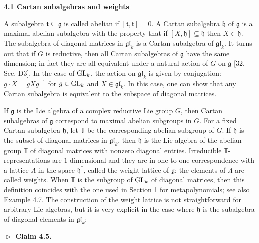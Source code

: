\documentclass[10pt,a4paper]{article}
\begin{document}
\par\medskip\noindent\textbf{4.1 Cartan subalgebras and weights}\par




A subalgebra $\mathfrak{t}\subseteq\mathfrak{g}$ is called abelian if $[\mathfrak{t},\mathfrak{t}]=0$. A Cartan subalgebra $\mathfrak{h}$ of $\mathfrak{g}$ is a maximal abelian subalgebra with the property that if $[X,\mathfrak{h}]\subseteq\mathfrak{h}$ then $X\in\mathfrak{h}$. The subalgebra of diagonal matrices in $\mathfrak{gl}_{k}$ is a Cartan subalgebra of $\mathfrak{gl}_{k}$. It turns out that if $G$ is reductive, then all Cartan subalgebras of $\mathfrak{g}$ have the same dimension; in fact they are all equivalent under a natural action of $G$ on $\mathfrak{g}$ [32, Sec. D3]. In the case of $\textnormal{GL}_{k}$, the action on $\mathfrak{gl}_{k}$ is given by conjugation: $g\cdot X=gXg^{-1}$ for $g\in\textnormal{GL}_{k}$ and $X\in\mathfrak{gl}_{k}$. In this case, one can show that any Cartan subalgebra is equivalent to the subspace of diagonal matrices.





If $\mathfrak{g}$ is the Lie algebra of a complex reductive Lie group $G$, then Cartan subalgebras of $\mathfrak{g}$ correspond to maximal abelian subgroups in $G$. For a fixed Cartan subalgebra $\mathfrak{h}$, let $\mathbb{T}$ be the corresponding abelian subgroup of $G$. If $\mathfrak{h}$ is the subset of diagonal matrices in $\mathfrak{gl}_{k}$, then $\mathfrak{h}$ is the Lie algebra of the abelian group $\mathbb{T}$ of diagonal matrices with nonzero diagonal entries.
Irreducible $\mathbb{T}$-representations are $1$-dimensional and they are in one-to-one correspondence with a lattice $\Lambda$ in the space $\mathfrak{h}^{*}$, called the weight lattice of $\mathfrak{g}$; the elements of $\Lambda$ are called weights. When $\mathbb{T}$ is the subgroup of $\textnormal{GL}_{k}$ of diagonal matrices, then this definition coincides with the one used in Section 1 for metapolynomials; see also Example 4.7. The construction of the weight lattice is not straightforward for arbitrary Lie algebras, but it is very explicit in the case where $\mathfrak{h}$ is the subalgebra of diagonal elements in $\mathfrak{gl}_{k}$:





\par\medskip\noindent\textbf{$\vartriangleright$ Claim 4.5.}\par
\end{document}
